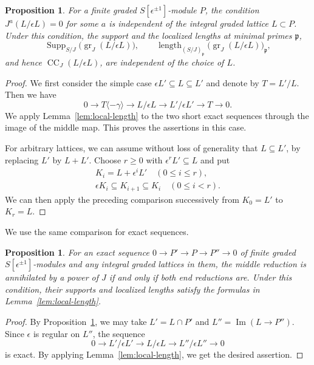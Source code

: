 \documentclass[11pt]{article}
\newtheorem{proposition}[theorem]{Proposition}
\theoremstyle{definition}
\newcommand{\gr}{\operatorname{gr}}
\newcommand{\im}{\operatorname{Im}}
\newcommand{\CC}{\operatorname{CC}}
\newcommand{\Supp}{\operatorname{Supp}}
\newcommand{\length}{\operatorname{length}}
\begin{document}
\begin{proposition}\label{prop:lattice-invariance}
For a finite graded $S[\epsilon^{\pm1}]$-module $P$, the condition
$J^a(L/\epsilon L)=0$ for some $a$ is independent of the integral
graded lattice $L\subset P$. Under this condition, the support and the
localized lengths at minimal primes $\mathfrak p$,
\[
 \Supp_{S/J}\bigl(\gr_J(L/\epsilon L)\bigr),\qquad
 \length_{(S/J)_{\mathfrak p}}
 \bigl(\gr_J(L/\epsilon L)\bigr)_{\mathfrak p},
\]
and hence $\CC_J(L/\epsilon L)$, are independent of the choice of $L$.
\end{proposition}
\begin{proof}
We first consider the simple case $\epsilon L'\subseteq L\subseteq L'$ and denote by $T=L'/L$. Then we have
\[
 0\longrightarrow T\langle-\gamma\rangle\longrightarrow L/\epsilon L
 \longrightarrow L'/\epsilon L'\longrightarrow T\longrightarrow0.
\]
We apply Lemma~\ref{lem:local-length} to the two short exact sequences
through the image of the middle map. This proves the assertions in this case.

For arbitrary lattices, we can assume without loss of generality that $L\subseteq L'$, by replacing $L'$ by $L+L'$.
Choose $r\geq0$ with $\epsilon^rL'\subseteq L$ and put
\[
 \begin{gathered}
 K_i=L+\epsilon^iL'\quad(0\leq i\leq r),\\
 \epsilon K_i\subseteq K_{i+1}\subseteq K_i\quad(0\leq i<r).
 \end{gathered}
\]
We can then apply the preceding comparison successively from $K_0=L'$ to $K_r=L$.
\end{proof}

We use the same comparison for exact sequences.

\begin{proposition}\label{prop:graded-exact}
For an exact sequence $0\to P'\to P\to P''\to0$ of finite graded
$S[\epsilon^{\pm1}]$-modules and any integral graded lattices in them,
the middle reduction is annihilated by a power of $J$ if and only if
both end reductions are. Under this condition, their supports and
localized lengths satisfy the formulas in Lemma~\ref{lem:local-length}.
\end{proposition}
\begin{proof}
By Proposition~\ref{prop:lattice-invariance}, we may take
$L'=L\cap P'$ and $L''=\im(L\to P'')$. Since $\epsilon$ is regular on $L''$, the sequence
\[
 0\longrightarrow L'/\epsilon L'\longrightarrow L/\epsilon L
 \longrightarrow L''/\epsilon L''\longrightarrow0
\]
is exact. By applying Lemma~\ref{lem:local-length}, we get the desired assertion.
\end{proof}
\end{document}

